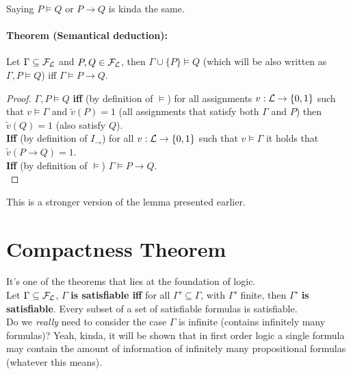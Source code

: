 	Saying $P \models Q$ or $P \rightarrow Q$ is kinda the same.\\

	\paragraph{Theorem (Semantical deduction):} Let $\Gamma \subseteq \mathcal{F}_\mathcal{L}$ and $P,Q \in \mathcal{F}_\mathcal{L}$, then $\Gamma \cup \{P\} \models Q$ (which will be also written as $\Gamma, P \models Q$) iff $\Gamma \models P \rightarrow Q$.\\

	\begin{proof}
		$\Gamma, P \models Q$ \textbf{iff} (by definition of $\models$) for all assignments $v: \mathcal{L} \rightarrow \{0,1\}$ such that $v \models \Gamma$ and $\tilde{v}(P) = 1$ (all assignments that satisfy both $\Gamma$ and $P$) then $\tilde{v}(Q) = 1$ (also satisfy $Q$).\\

		\textbf{Iff} (by definition of $I_\rightarrow$) for all $v: \mathcal{L} \rightarrow \{0,1\}$ such that $v \models \Gamma$ it holds that $\tilde{v}(P \rightarrow Q) =1$.\\

		\textbf{Iff} (by definition of $\models$) $\Gamma \models P \rightarrow Q$.\\
	\end{proof}

	This is a stronger version of the lemma presented earlier.\\

	\newpage

	\section{Compactness Theorem}
	It's one of the theorems that lies at the foundation of logic. \\

	Let $\Gamma \subseteq \mathcal{F}_\mathcal{L}$, $\Gamma$ \textbf{is satisfiable iff} for all $\Gamma' \subseteq \Gamma$, with $\Gamma'$ finite, then $\Gamma'$ \textbf{is satisfiable}. Every subset of a set of satisfiable formulas is satisfiable.\\

	Do we \textit{really} need to consider the case $\Gamma$ is infinite (contains infinitely many formulas)? Yeah, kinda, it will be shown that in first order logic a single formula may contain the amount of information of infinitely many propositional formulas (whatever this means).\\

